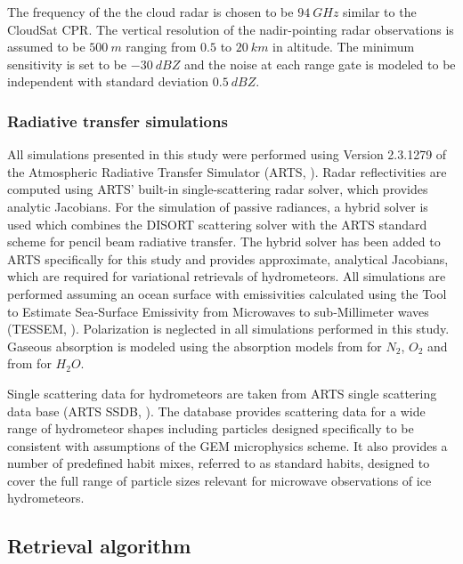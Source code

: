 \documentclass[journal abbreviation, manuscript]{copernicus}
\begin{document}
The frequency of the the cloud radar is chosen to be $94\ \unit{GHz}$ similar to
the CloudSat CPR. The vertical resolution of the nadir-pointing radar observations
is assumed to be $500\ \unit{m}$ ranging from $0.5$ to $20\ \unit{km}$ in
altitude. The minimum sensitivity is set to be $-30\ \unit{dBZ}$ and the noise
at each range gate is modeled to be independent with standard deviation
$0.5\ \unit{dBZ}$.

\subsubsection{Radiative transfer simulations}
\label{sec:orge741b86}

All simulations presented in this study were performed using Version 2.3.1279 of
the Atmospheric Radiative Transfer Simulator (ARTS, \cite{arts18}). Radar
reflectivities are computed using ARTS' built-in single-scattering radar solver,
which provides analytic Jacobians. For the simulation of passive radiances, a
hybrid solver is used which combines the DISORT \citep{disort00} scattering
solver with the ARTS standard scheme for pencil beam radiative transfer. The
hybrid solver has been added to ARTS specifically for this study and provides
approximate, analytical Jacobians, which are required for  variational
retrievals of hydrometeors. All simulations are performed assuming an ocean
surface with emissivities calculated using the Tool to Estimate Sea‐Surface
Emissivity from Microwaves to sub‐Millimeter waves (TESSEM, \cite{prigent16}).
Polarization is neglected in all simulations performed in this study. Gaseous
absorption is modeled using the absorption models from \cite{rosenkranz93} for
$N_2$, $O_2$ and from \cite{rosenkranz98} for $H_2O$.

Single scattering data for hydrometeors are taken from ARTS single scattering
data base (ARTS SSDB, \citet{eriksson18}). The database provides scattering data
for a wide range of hydrometeor shapes including particles designed specifically
to be consistent with assumptions of the GEM microphysics scheme. It also
provides a number of predefined habit mixes, referred to as standard habits,
designed to cover the full range of particle sizes relevant for microwave
observations of ice hydrometeors.

\subsection{Retrieval algorithm}
\label{sec:orgb528563}
\end{document}
